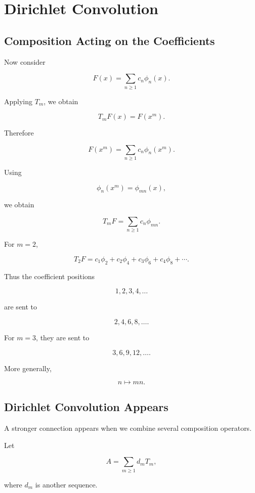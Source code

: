 
\chapter{Dirichlet Convolution}

\section{Composition Acting on the Coefficients}

Now consider

\[
F(x)
=
\sum_{n\geq1}c_n\phi_n(x).
\]

Applying \(T_m\), we obtain

\[
T_mF(x)
=
F(x^m).
\]

Therefore

\[
F(x^m)
=
\sum_{n\geq1}c_n\phi_n(x^m).
\]

Using

\[
\phi_n(x^m)=\phi_{mn}(x),
\]

we obtain

\[
\boxed{
T_mF
=
\sum_{n\geq1}c_n\phi_{mn}.
}
\]

For \(m=2\),

\[
T_2F
=
c_1\phi_2
+
c_2\phi_4
+
c_3\phi_6
+
c_4\phi_8
+\cdots.
\]

Thus the coefficient positions

\[
1,2,3,4,\ldots
\]

are sent to

\[
2,4,6,8,\ldots.
\]

For \(m=3\), they are sent to

\[
3,6,9,12,\ldots.
\]

More generally,

\[
\boxed{
n\longmapsto mn.
}
\]

\section{Dirichlet Convolution Appears}

A stronger connection appears when we combine several composition
operators.

Let

\[
A
=
\sum_{m\geq1}d_mT_m,
\]

where \(d_m\) is another sequence.


